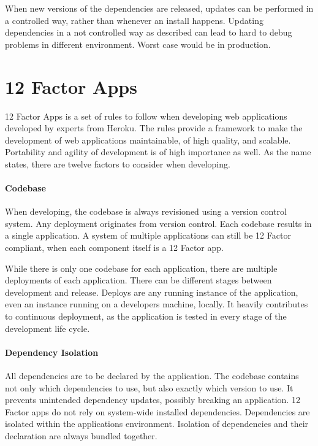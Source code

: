 When new versions of the dependencies are released, updates can be performed in
a controlled way, rather than whenever an install happens. Updating
dependencies in a not controlled way as described can lead to hard to debug
problems in different environment. Worst case would be in production.
\cite{dependency_locking}

\section{12 Factor Apps}

12 Factor Apps is a set of rules to follow when developing web applications
developed by experts from Heroku. The rules provide a framework to make the
development of web applications maintainable, of high quality, and scalable.
Portability and agility of development is of high importance as well. As the
name states, there are twelve factors to consider when developing.
\cite{12factor}

\paragraph{Codebase}

When developing, the codebase is always revisioned using a version control
system. Any deployment originates from version control. Each codebase results
in a single application. A system of multiple applications can still be 12
Factor compliant, when each component itself is a 12 Factor app.

While there is only one codebase for each application, there are multiple
deployments of each application. There can be different stages between
development and release. Deploys are any running instance of the application,
even an instance running on a developers machine, locally. It heavily
contributes to continuous deployment, as the application is tested in every
stage of the development life cycle.

\paragraph{Dependency Isolation}

All dependencies are to be declared by the application. The codebase contains
not only which dependencies to use, but also exactly which version to use. It
prevents unintended dependency updates, possibly breaking an application. 12
Factor apps do not rely on system-wide installed dependencies. Dependencies are
isolated within the applications environment. Isolation of dependencies and
their declaration are always bundled together.


